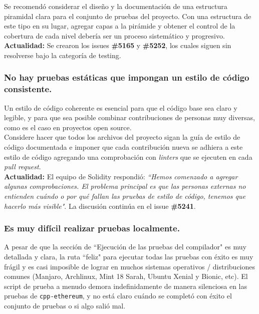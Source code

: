 Se recomendó considerar el diseño y la documentación de una estructura piramidal clara para el conjunto de pruebas del proyecto. Con una estructura de este tipo en su lugar, agregar capas a la pirámide y obtener el control de la cobertura de cada nivel debería ser un proceso sistemático y progresivo.\\

\textbf{Actualidad: }Se crearon los issues \textbf{\#5165}\cite{GHI5165} y \textbf{\#5252}\cite{GHI5252}, los cuales siguen sin resolverse bajo la categoría de testing.\\

\subsubsection{No hay pruebas estáticas que impongan un estilo de código consistente.}

Un estilo de código coherente es esencial para que el código base sea claro y legible, y para que sea posible combinar contribuciones de personas muy diversas, como es el caso en proyectos open source.\\

Considere hacer que todos los archivos del proyecto sigan la guía de estilo de código documentada\cite{SolidityStyleGuide} e imponer que cada contribución nueva se adhiera a este estilo de código agregando una comprobación con \textit{linters} que se ejecuten en cada \textit{pull request}.\\

\textbf{Actualidad:} El equipo de Solidity respondió: \textit{``Hemos comenzado a agregar algunas comprobaciones. El problema principal es que las personas externas no entienden cuándo o por qué fallan las pruebas de estilo de código, tenemos que hacerlo más visible"}. La discusión continúa en el issue \textbf{\#5241\cite{GHI5241}}.\\

\subsubsection{Es muy difícil realizar pruebas localmente.}
A pesar de que la sección de ``Ejecución de las pruebas del compilador"\cite{SolidityContributingTests} es muy detallada y clara, la ruta ``feliz" para ejecutar todas las pruebas con éxito es muy frágil y es casi imposible de lograr en muchos sistemas operativos / distribuciones comunes (Manjaro, Archlinux, Mint 18 Sarah, Ubuntu Xenial y Bionic, etc). El script de prueba a menudo demora indefinidamente de manera silenciosa en las pruebas de \verb|cpp-ethereum|, y no está claro cuándo se completó con éxito el conjunto de pruebas o si algo salió mal.\\

